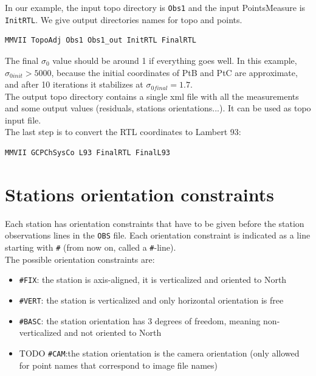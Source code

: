 In our example, the input topo directory is \texttt{Obs1} and the input PointsMeasure is \texttt{InitRTL}.
We give output directories names for topo and points.
\begin{lstlisting}
MMVII TopoAdj Obs1 Obs1_out InitRTL FinalRTL
\end{lstlisting}

The final $\sigma_0$ value should be around 1 if everything goes well.
In this example, $\sigma_{0 init} > 5000$, because the initial coordinates of PtB and PtC are approximate,
and after 10 iterations it stabilizes at $\sigma_{0 final} = 1.7$.
\\

The output topo directory contains a single xml file with all the measurements and some output values (residuals,
stations orientations...). It can be used as topo input file.
\\

The last step is to convert the RTL coordinates to Lambert 93:

\begin{lstlisting}
MMVII GCPChSysCo L93 FinalRTL FinalL93
\end{lstlisting}


\section{Stations orientation constraints}

Each station has orientation constraints that have to be given before the station observations lines in the \texttt{OBS} file.
Each orientation constraint is indicated as a line starting with \texttt{\#} (from now on, called a \texttt{\#}-line).
\\

The possible orientation constraints are:
\begin{itemize}
   \item \texttt{\#FIX}: the station is axis-aligned, it is verticalized and oriented to North
   \item \texttt{\#VERT}: the station is verticalized and only horizontal orientation is free
   \item \texttt{\#BASC}: the station orientation has 3 degrees of freedom, meaning non-verticalized and not oriented to North
   \item TODO \texttt{\#CAM}:the station orientation is the camera orientation (only allowed for point names that correspond to image file names)
\end{itemize}


